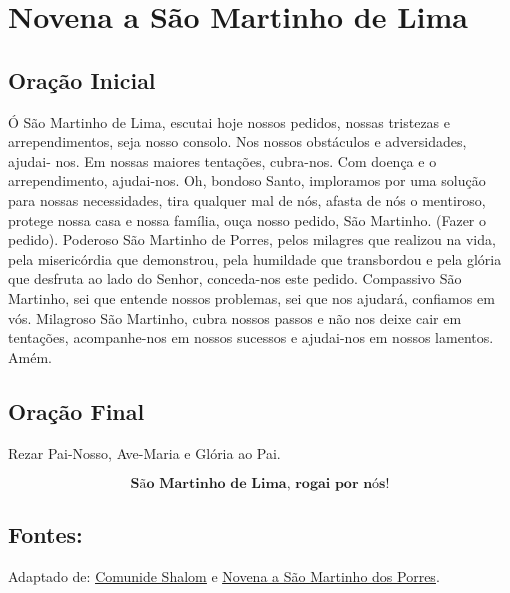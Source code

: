 \documentclass[a4paper,14pt]{extarticle} \usepackage[utf8]{inputenc}
\begin{document}
\newpage

\section{Novena a São Martinho de Lima}

\subsection{Oração Inicial} \label{oracao-inicial}

Ó São Martinho de Lima, escutai hoje nossos pedidos, nossas tristezas e arrependimentos, seja nosso consolo. Nos nossos obstáculos e adversidades, ajudai- nos. Em nossas maiores tentações, cubra-nos. Com doença e o arrependimento, ajudai-nos.
Oh, bondoso Santo, imploramos por uma solução para nossas necessidades, tira qualquer mal de nós, afasta de nós o mentiroso, protege nossa casa e nossa família, ouça nosso pedido, São Martinho.
(Fazer o pedido).
Poderoso São Martinho de Porres, pelos milagres que realizou na vida, pela misericórdia que demonstrou, pela humildade que transbordou e pela glória que desfruta ao lado do Senhor, conceda-nos este pedido.
Compassivo São Martinho, sei que entende nossos problemas, sei que nos ajudará, confiamos em vós. Milagroso São Martinho, cubra nossos passos e não nos deixe cair
em tentações, acompanhe-nos em nossos sucessos e ajudai-nos em nossos lamentos. Amém.

\subsection{Oração Final} \label{oracao-final}

Rezar Pai-Nosso, Ave-Maria e Glória ao Pai.

\[
\textbf{São Martinho de Lima, rogai por nós!}
\]

\vfill

\begin{center}
\subsection*{Fontes:}
Adaptado de: \underline{\href{https://comshalom.org/sao-martinho-de-lima-o-santo-que-venceu-todas-as-barreiras-pela-via-do-amor/}{Comunide Shalom}} e \underline{\href{https://www.scribd.com/document/742970466/Novena-a-Sao-Martinho-de-Porres}{Novena a São Martinho dos Porres}}.
\end{center}
\end{document}

